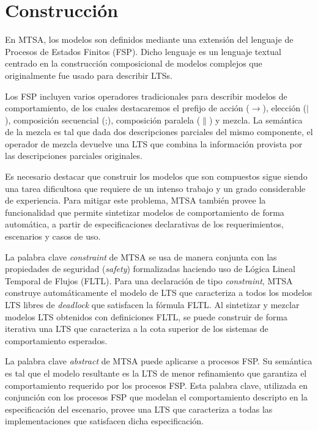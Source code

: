 \section{Construcción}

En MTSA, los modelos son definidos mediante una extensión del lenguaje de Procesos de Estados Finitos (FSP). Dicho
lenguaje es un lenguaje textual centrado en la construcción composicional de modelos complejos que originalmente fue
usado para describir LTSs.

Los FSP incluyen varios operadores tradicionales para describir modelos de comportamiento, de los cuales destacaremos el
prefijo de acción ($\rightarrow$), elección ($|$), composición secuencial (;), composición paralela ($\|$) y mezcla.
La semántica de la mezcla es tal que dada dos descripciones parciales del mismo componente, el operador de mezcla
devuelve una LTS que combina la información provista por las descripciones parciales originales.

Es necesario destacar que construir los modelos que son compuestos sigue siendo una tarea dificultosa que requiere de un
intenso trabajo y un grado considerable de experiencia. Para mitigar este problema, MTSA también provee la funcionalidad
que permite sintetizar modelos de comportamiento de forma automática, a partir de especificaciones declarativas de los
requerimientos, escenarios y casos de uso.

La palabra clave \emph{constraint} de MTSA se usa de manera conjunta con las propiedades de seguridad (\emph{safety})
formalizadas haciendo uso de Lógica Lineal Temporal de Flujos (FLTL). Para una declaración de tipo \emph{constraint},
MTSA construye automáticamente el modelo de LTS que caracteriza a todos los modelos LTS libres de \emph{deadlock} que
satisfacen la fórmula FLTL. Al sintetizar y mezclar modelos LTS obtenidos con definiciones FLTL, se puede construir de
forma iterativa una LTS que caracteriza a la cota superior de los sistemas de comportamiento esperados.

La palabra clave \emph{abstract} de MTSA puede aplicarse a procesos FSP. Su semántica es tal que el modelo resultante es
la LTS de menor refinamiento que garantiza el comportamiento requerido por los procesos FSP. Esta palabra clave,
utilizada en conjunción con los procesos FSP que modelan el comportamiento descripto en la especificación del escenario,
provee una LTS que caracteriza a todas las implementaciones que satisfacen dicha especificación.
